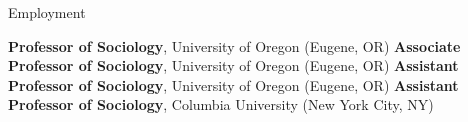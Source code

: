 \begin{rubric}{Employment}

\entry*[2026 -- ] \textbf{Professor of Sociology}, University of Oregon (Eugene, OR) 
\entry*[2014 -- 2026] \textbf{Associate Professor of Sociology}, University of Oregon (Eugene, OR) 
\entry*[2007 -- 2014] \textbf{Assistant Professor of Sociology}, University of Oregon (Eugene, OR) 
\entry*[2004 -- 2007] \textbf{Assistant Professor of Sociology}, Columbia University (New York City, NY) 

\end{rubric}